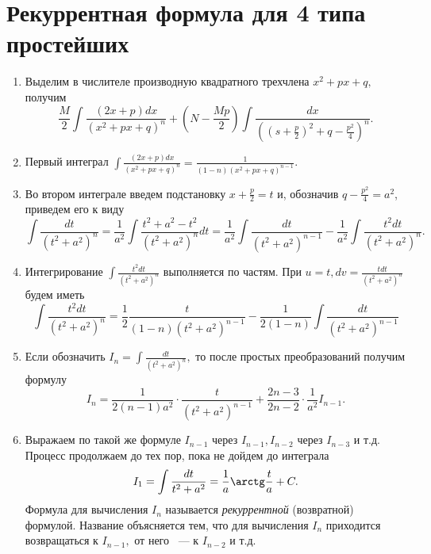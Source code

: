 \documentclass[11pt]{article}
\begin{document}
	\section{Рекуррентная формула для 4 типа простейших}
	\begin{enumerate}
		\item Выделим в числителе производную квадратного трехчлена $x^2 + px + q,$ получим
		$$
			\frac{M}{2}\int\frac{(2x + p)dx}{(x^2 + px + q)^n} + \left(N - \frac{Mp}{2}\right)\int\frac{dx}{\left(\left(s + \frac{p}{2}\right)^2 + q - \frac{p^2}{4}\right)^n}.
		$$
		\item Первый интеграл $\int\frac{(2x + p)dx}{(x^2 + px + q)^n} = \frac{1}{(1 - n)(x^2 + px + q)^{n - 1}}$.
		\item Во втором интеграле введем подстановку $x + \frac{p}{2} = t$ и, обозначив $q - \frac{p^2}{4} = a^2$, приведем его к виду
		$$
			\int\frac{dt}{(t^2 + a^2)^n} = \frac{1}{a^2}\int\frac{t^2 + a^2 - t^2}{(t^2 + a^2)^n}dt = \frac{1}{a^2}\int\frac{dt}{(t^2 + a^2)^{n-1}}-\frac{1}{a^2}\int\frac{t^2dt}{(t^2 + a^2)^n}.
		$$
		\item Интегрирование $\int\frac{t^2dt}{(t^2 + a^2)^n}$ выполняется по частям. При $u = t, dv = \frac{tdt}{(t^2 + a^2)^n}$ будем иметь
		$$
			\int\frac{t^2dt}{(t^2 + a^2)^n} = \frac{1}{2}\frac{t}{(1 - n)(t^2 + a^2)^{n - 1}} - \frac{1}{2(1 - n)}\int\frac{dt}{(t^2 + a^2)^{n - 1}}
		$$
		\item Если обозначить $I_n = \int\frac{dt}{(t^2 + a^2)^n},$ то после простых преобразований получим формулу
		$$
			I_n = \frac{1}{2(n - 1)a^2}\cdot\frac{t}{(t^2 + a^2)^{n - 1}} + \frac{2n - 3}{2n - 2}\cdot\frac{1}{a^2}I_{n - 1}.
		$$
		\item Выражаем по такой же формуле $I_{n-1}$ через $I_{n - 1}, I_{n - 2}$ через $I_{n - 3}$ и т.д. Процесс продолжаем до тех пор, пока не дойдем до интеграла
		$$
			I_1 = \int\frac{dt}{t^2 + a^2} = \frac{1}{a}\arctg\frac{t}{a} + C.
		$$
		Формула для вычисления $I_n$ называется \textit{рекуррентной} (возвратной) формулой. Название объясняется тем, что для вычисления $I_n$ приходится возвращаться к $I_{n - 1},$ от него ~--- к $I_{n - 2}$ и т.д.
	\end{enumerate}
\end{document}
